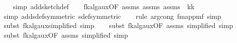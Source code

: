 \begin{isabellebody}
\ \ %
\endisadelimproof
%
\isatagproof
{}\isamarkupfalse%
\ {\isacharparenleft}{\kern0pt}simp\ add{\isacharcolon}{\kern0pt}sketch{\isacharunderscore}{\kern0pt}def{\isacharparenright}{\kern0pt}\isanewline
\ \ \isamarkupfalse%
\ fk{\isacharunderscore}{\kern0pt}alg{\isacharunderscore}{\kern0pt}aux{\isacharunderscore}{\kern0pt}{}{\isacharbrackleft}{\kern0pt}OF\ assms{\isacharparenleft}{\kern0pt}{}{\isacharparenright}{\kern0pt}\ assms{\isacharparenleft}{\kern0pt}{}{\isacharparenright}{\kern0pt}\ assms{\isacharparenleft}{\kern0pt}{}{\isacharparenright}{\kern0pt}{\isacharcomma}{\kern0pt}\ \ k{\isacharequal}{\kern0pt}{\isachardoublequoteopen}k{\isachardoublequoteclose}\ \ {\isasymepsilon}{\isacharequal}{\kern0pt}{\isachardoublequoteopen}{\isasymepsilon}{\isachardoublequoteclose}{\isacharbrackright}{\kern0pt}\isanewline
\ \ \isamarkupfalse%
\ {\isacharparenleft}{\kern0pt}simp\ add{\isacharcolon}{\kern0pt}sdef{\isacharbrackleft}{\kern0pt}symmetric{\isacharbrackright}{\kern0pt}\ sdef{\isacharbrackleft}{\kern0pt}symmetric{\isacharbrackright}{\kern0pt}{\isacharparenright}{\kern0pt}\isanewline
\ \ \isamarkupfalse%
\ {\isacharparenleft}{\kern0pt}rule\ arg{\isacharunderscore}{\kern0pt}cong{}{\isacharbrackleft}{\kern0pt}\ f{\isacharequal}{\kern0pt}{\isachardoublequoteopen}map{\isacharunderscore}{\kern0pt}pmf{\isachardoublequoteclose}{\isacharbrackright}{\kern0pt}{\isacharcomma}{\kern0pt}\ simp{\isacharparenright}{\kern0pt}\isanewline
\ \ \isamarkupfalse%
\ {\isacharparenleft}{\kern0pt}subst\ fk{\isacharunderscore}{\kern0pt}alg{\isacharunderscore}{\kern0pt}aux{\isacharunderscore}{\kern0pt}{}{\isacharbrackleft}{\kern0pt}simplified{\isacharbrackright}{\kern0pt}{\isacharcomma}{\kern0pt}\ simp{\isacharparenright}{\kern0pt}\isanewline
\ \ \isamarkupfalse%
\ {\isacharparenleft}{\kern0pt}subst\ fk{\isacharunderscore}{\kern0pt}alg{\isacharunderscore}{\kern0pt}aux{\isacharunderscore}{\kern0pt}{}{\isacharbrackleft}{\kern0pt}OF\ assms{\isacharparenleft}{\kern0pt}{}{\isacharparenright}{\kern0pt}{\isacharcomma}{\kern0pt}\ simplified{\isacharbrackright}{\kern0pt}{\isacharcomma}{\kern0pt}\ simp{\isacharparenright}{\kern0pt}\isanewline
\ \ \isamarkupfalse%
\ {\isacharparenleft}{\kern0pt}subst\ fk{\isacharunderscore}{\kern0pt}alg{\isacharunderscore}{\kern0pt}aux{\isacharunderscore}{\kern0pt}{}{\isacharbrackleft}{\kern0pt}OF\ assms{\isacharparenleft}{\kern0pt}{}{\isacharparenright}{\kern0pt}{\isacharcomma}{\kern0pt}\ simplified{\isacharbrackright}{\kern0pt}{\isacharcomma}{\kern0pt}\ simp{\isacharparenright}{\kern0pt}%

\end{isabellebody}
